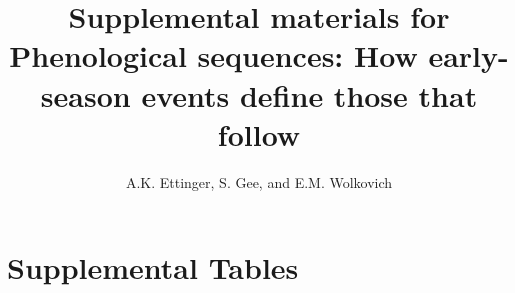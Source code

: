 \documentclass{article}
\begin{document}

\title{Supplemental materials for \\ Phenological sequences: How early-season events define those that follow} 
\author{A.K. Ettinger, S. Gee, and E.M. Wolkovich}
\maketitle  %
\renewcommand{\thetable}{S\arabic{table}}
\renewcommand{\thefigure}{S\arabic{figure}}





%

\section* {Supplemental Tables}
\end{document}
